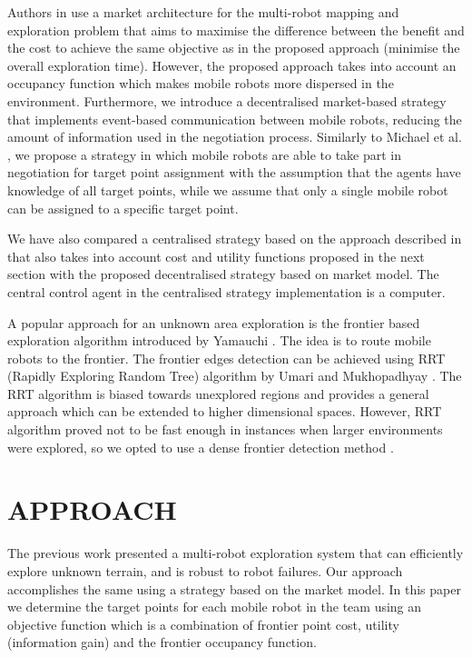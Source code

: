 \documentclass[letterpaper, 10 pt, conference]{ieeeconf}  %
\begin{document}
Authors in \cite{market-economy} use a market architecture for the multi-robot mapping and exploration problem that aims to maximise the difference between the benefit and the cost to achieve the same objective as in the proposed approach (minimise the overall exploration time). However, the proposed approach takes into account an occupancy function which makes mobile robots more dispersed in the environment. Furthermore, we introduce a decentralised market-based strategy that implements event-based communication between mobile robots, reducing the amount of information used in the negotiation process. Similarly to Michael et al. \cite{Michael}, we propose a strategy in which mobile robots are able to take part in negotiation for target point assignment with the assumption that the agents have knowledge of all target points, while we assume that only a single mobile robot can be assigned to a specific target point.  

We have also compared a centralised strategy based on the approach described in \cite{burgard} that also takes into account cost and utility functions proposed in the next section with the proposed decentralised strategy based on market model. The central control agent in the centralised strategy implementation is a computer.

A popular approach for an unknown area exploration is the frontier based exploration algorithm introduced by Yamauchi \cite{Yamauchi}. The idea is to route mobile robots to the frontier. The frontier edges detection can be achieved using RRT (Rapidly Exploring Random Tree) algorithm by Umari and Mukhopadhyay \cite{Umari}. The RRT algorithm is biased towards unexplored regions and provides a general approach which can be extended to higher dimensional spaces. However, RRT algorithm proved not to be fast enough in instances when larger environments were explored, so we opted to use a dense frontier detection method \cite{juraj}.   

\section{APPROACH}

The previous work presented a multi-robot exploration system that can efficiently explore unknown terrain, and is robust to robot failures. Our approach accomplishes the same using a strategy based on the market model. 
In this paper we determine the target points for each mobile robot in the team using an objective function which is a combination of frontier point cost, utility (information gain) and the frontier occupancy function. 
\end{document}
